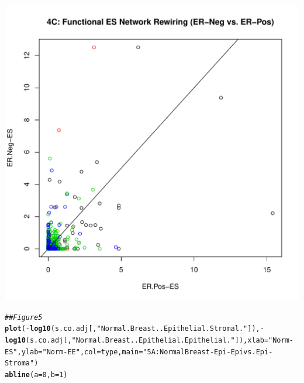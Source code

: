 \documentclass{article}\usepackage[]{graphicx}\usepackage[]{color}
\makeatletter
\def\maxwidth{ %
  \ifdim\Gin@nat@width>\linewidth
    \linewidth
  \else
    \Gin@nat@width
  \fi
}
\newcommand{\hlnum}[1]{\textcolor[rgb]{0.686,0.059,0.569}{#1}}%
\newcommand{\hlstr}[1]{\textcolor[rgb]{0.192,0.494,0.8}{#1}}%
\newcommand{\hlcom}[1]{\textcolor[rgb]{0.678,0.584,0.686}{\textit{#1}}}%
\newcommand{\hlopt}[1]{\textcolor[rgb]{0,0,0}{#1}}%
\newcommand{\hlstd}[1]{\textcolor[rgb]{0.345,0.345,0.345}{#1}}%
\newcommand{\hlkwc}[1]{\textcolor[rgb]{0.333,0.667,0.333}{#1}}%
\newcommand{\hlkwd}[1]{\textcolor[rgb]{0.737,0.353,0.396}{\textbf{#1}}}%
\newenvironment{kframe}{%
 \def\at@end@of@kframe{}%
 \ifinner\ifhmode%
  \def\at@end@of@kframe{\end{minipage}}%
  \begin{minipage}{\columnwidth}%
 \fi\fi%
 \def\FrameCommand##1{\hskip\@totalleftmargin \hskip-\fboxsep
 \colorbox{shadecolor}{##1}\hskip-\fboxsep
     \hskip-\linewidth \hskip-\@totalleftmargin \hskip\columnwidth}%
 \MakeFramed {\advance\hsize-\width
   \@totalleftmargin\z@ \linewidth\hsize
   \@setminipage}}%
 {\par\unskip\endMakeFramed%
 \at@end@of@kframe}
\newenvironment{knitrout}{}{} %
\makeatother
\begin{document}
\begin{knitrout}
\begin{kframe}
\begin{alltt}
\end{alltt}
\end{kframe}
\includegraphics[width=\maxwidth]{figure/Figure_4__Analysis_of_SANTA_Results-3} 
\begin{kframe}\begin{alltt}
\hlcom{## Figure 5   }
\hlkwd{plot}\hlstd{(}\hlopt{-}\hlkwd{log10}\hlstd{(s.co.adj[,}\hlstr{"Normal.Breast..Epithelial.Stromal."}\hlstd{]),}\hlopt{-}\hlkwd{log10}\hlstd{(s.co.adj[,}\hlstr{"Normal.Breast..Epithelial.Epithelial."}\hlstd{]),}\hlkwc{xlab}\hlstd{=}\hlstr{"Norm-ES"}\hlstd{,}\hlkwc{ylab}\hlstd{=}\hlstr{"Norm-EE"}\hlstd{,}\hlkwc{col}\hlstd{=type,} \hlkwc{main} \hlstd{=} \hlstr{"5A: Normal Breast - Epi-Epi vs. Epi-Stroma"}\hlstd{)}
\hlkwd{abline}\hlstd{(}\hlkwc{a}\hlstd{=}\hlnum{0}\hlstd{,}\hlkwc{b}\hlstd{=}\hlnum{1}\hlstd{)}
\end{alltt}
\end{kframe}

\end{knitrout}
\end{document}
